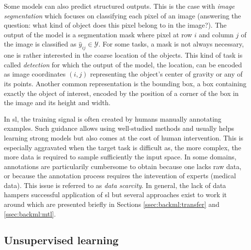 Some models can also predict structured outputs. This is the case with
\textit{image segmentation} which focuses on classifying each pixel of an image
(\ie answering the question: what kind of object does this pixel belong to in the
image?). The output of the model is a segmentation mask where pixel at row $i$
and column $j$ of the image is classified as $\hat{y}_{ij} \in \mathcal{Y}$. For
some tasks, a mask is not always necessary, one is rather interested in the coarse
location of the objects. This kind of task is called \textit{detection} for which
the output of the model, the location, can be encoded as image coordinates $(i, j)$
representing the object's center of gravity or any of its points. Another common
representation is the bounding box, a box containing exactly the object of interest,
encoded by the position of a corner of the box in the image and its height and
width.

In \acrlong{sl}, the training signal is often created by humans manually annotating
examples. Such guidance allows using well-studied methods and usually helps learning
strong models but also comes at the cost of human intervention. This is especially
aggravated when the target task is difficult as, the more complex, the more data
is required to sample sufficiently the input space. In some domains, annotations
are particularily cumbersome to obtain because one lacks raw data, or because the
annotation process requires the intevention of experts (\eg medical data). This
issue is referred to as \textit{data scarcity}. In general, the lack of data
hampers successful application of \acrlong{sl} but several approaches exist to
work it around which are presented briefly in Sections \ref{ssec:backml:transfer}
and \ref{ssec:backml:mtl}.

\subsection{Unsupervised learning}
\label{ssec:backml:usl}

